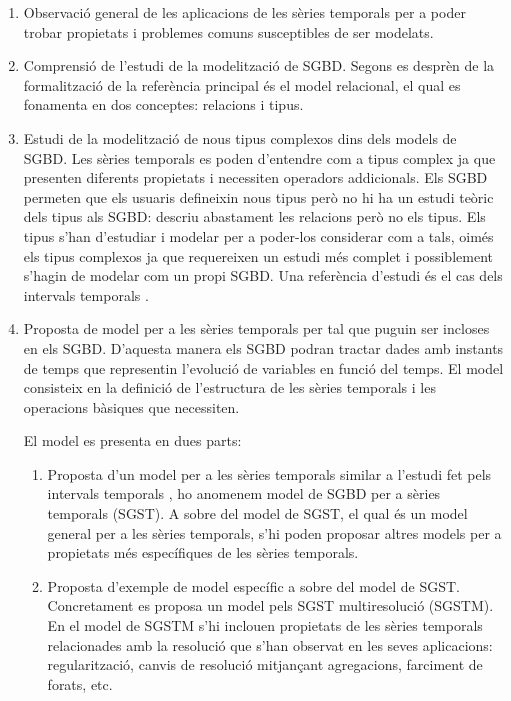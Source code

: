 \begin{enumerate}

\item Observació general de les aplicacions de les sèries temporals
  per a poder trobar propietats i problemes comuns susceptibles de ser
  modelats.


\item Comprensió de l'estudi de la modelització de SGBD. Segons es
  desprèn de la formalització de \textcite{date:introduction} la
  referència principal és el model relacional, el qual es fonamenta en
  dos conceptes: relacions i tipus.

\item Estudi de la modelització de nous tipus complexos dins dels
  models de SGBD.  Les sèries temporals es poden d'entendre com a
  tipus complex ja que presenten diferents propietats i necessiten
  operadors addicionals.  Els SGBD permeten que els usuaris defineixin
  nous tipus \parencite{stonebraker86} però no hi ha un estudi teòric
  dels tipus als SGBD: \textcite{date:introduction} descriu abastament
  les relacions però no els tipus. Els tipus s'han d'estudiar i
  modelar per a poder-los considerar com a tals, oimés els tipus
  complexos ja que requereixen un estudi més complet i possiblement
  s'hagin de modelar com un propi SGBD. Una referència d'estudi és el
  cas dels intervals
  temporals \parencite{date02:_tempor_data_relat_model}.



\item Proposta de model per a les sèries temporals per tal que puguin
  ser incloses en els SGBD. D'aquesta manera els SGBD podran tractar
  dades amb instants de temps que representin l'evolució de variables
  en funció del temps. El model consisteix en la definició de
  l'estructura de les sèries temporals i les operacions bàsiques que
  necessiten.

  El model es presenta en dues parts:

  \begin{enumerate}
  \item Proposta d'un model per a les sèries temporals similar a
    l'estudi fet pels intervals
    temporals \parencite{date02:_tempor_data_relat_model}, ho anomenem
    model de SGBD per a sèries temporals (SGST). A sobre del model de
    SGST, el qual és un model general per a les sèries temporals, s'hi
    poden proposar altres models per a propietats més específiques de
    les sèries temporals.

  \item Proposta d'exemple de model específic a sobre del model de
    SGST. Concretament es proposa un model pels SGST multiresolució
    (SGSTM).  En el model de SGSTM s'hi inclouen propietats de les
    sèries temporals relacionades amb la resolució que s'han observat
    en les seves aplicacions: regularització, canvis de resolució
    mitjançant agregacions, farciment de forats, etc.  
  \end{enumerate}


\end{enumerate}
